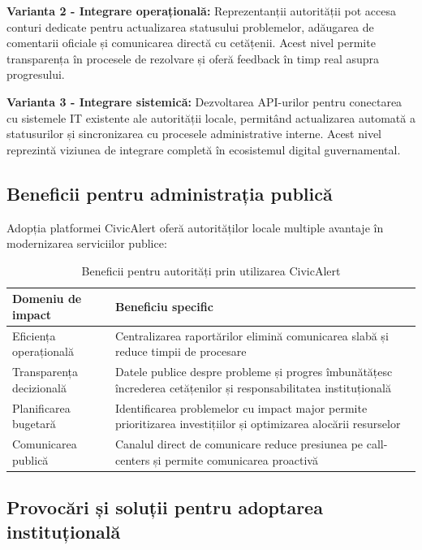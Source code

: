 \documentclass[12pt,a4paper]{report}
\begin{document}
\textbf{Varianta 2 - Integrare operațională:} Reprezentanții autorității pot accesa conturi dedicate pentru actualizarea statusului problemelor, adăugarea de comentarii oficiale și comunicarea directă cu cetățenii. Acest nivel permite transparența în procesele de rezolvare și oferă feedback în timp real asupra progresului.

\textbf{Varianta 3 - Integrare sistemică:} Dezvoltarea API-urilor pentru conectarea cu sistemele IT existente ale autorității locale, permitând actualizarea automată a statusurilor și sincronizarea cu procesele administrative interne. Acest nivel reprezintă viziunea de integrare completă în ecosistemul digital guvernamental.

\subsection{Beneficii pentru administrația publică}

Adopția platformei CivicAlert oferă autorităților locale multiple avantaje în modernizarea serviciilor publice:

\begin{table}[H]
\centering
\caption{Beneficii pentru autorități prin utilizarea CivicAlert}
\label{tab:beneficii_autoritati}
\begin{tabular}{|p{5cm}|p{8cm}|}
\hline
\textbf{Domeniu de impact} & \textbf{Beneficiu specific} \\
\hline
Eficiența operațională & Centralizarea raportărilor elimină comunicarea slabă și reduce timpii de procesare  \\
\hline
Transparența decizională & Datele publice despre probleme și progres îmbunătățesc încrederea cetățenilor și responsabilitatea instituțională \\
\hline
Planificarea bugetară & Identificarea problemelor cu impact major permite prioritizarea investițiilor și optimizarea alocării resurselor \\
\hline
Comunicarea publică & Canalul direct de comunicare reduce presiunea pe call-centers și permite comunicarea proactivă \\
\hline
\end{tabular}
\end{table}

\subsection{Provocări și soluții pentru adoptarea instituțională}
\end{document}
